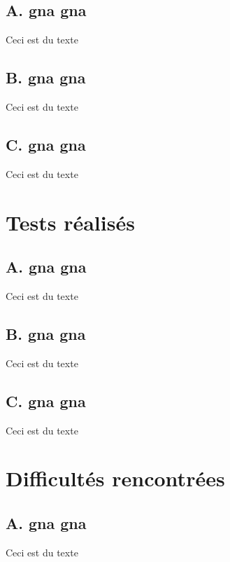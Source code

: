 \documentclass[12pt]{article}
\begin{document}
		\subsection{ A. gna gna}
		
		Ceci est du texte
		
		\subsection{ B. gna gna}
		
		Ceci est du texte
		
		\subsection{ C. gna gna}
		
		Ceci est du texte
		
		\clearpage
		
	\section{Tests réalisés}    

		\subsection{ A. gna gna}
		
		Ceci est du texte
		
		\subsection{ B. gna gna}
		
		Ceci est du texte
		
		\subsection{ C. gna gna}
		
		Ceci est du texte
		
		\clearpage
		
	\section{Difficultés rencontrées}    

		\subsection{ A. gna gna}
		
		Ceci est du texte
		
\end{document}
